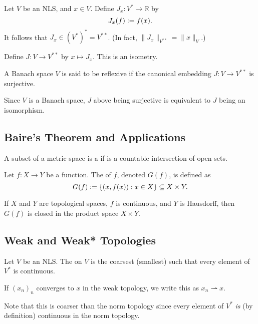 \documentclass[12pt]{article}	%
\newcommand{\weak}{\rightharpoonup}
\begin{document}
\begin{defn}
	Let $V$ be an NLS, and $x \in V$. Define $J_{x} : V^{\ast} \to \mathbb{R}$ by
	\begin{equation*} 
		J_{x}(f) \vcentcolon= f(x).
	\end{equation*}
	It follows that $J_{x} \in (V^{\ast})^{\ast} = V^{\ast \ast}$. (In fact, $\|J_{x}\|_{V^{\ast \ast}} = \|x\|_{V}$.)

	Define $J : V \to V^{\ast \ast}$ by $x \mapsto J_{x}$. This is an isometry.

	A Banach space $V$ is said to be reflexive if the canonical embedding $J : V \to V^{\ast \ast}$ is surjective.
\end{defn}
Since $V$ is a Banach space, $J$ above being surjective is equivalent to $J$ being an isomorphism.

\subsection{Baire's Theorem and Applications}

\begin{defn}
	A subset of a metric space is a  if is a countable intersection of open sets.
\end{defn}

\begin{defn}
	Let $f : X \to Y$ be a function. The  of $f$, denoted $G(f)$, is defined as
	\begin{equation*} 
		G(f) \vcentcolon= \{(x, f(x)) : x \in X\} \subset X \times Y.
	\end{equation*}
\end{defn}
If $X$ and $Y$ are topological spaces, $f$ is continuous, and $Y$ is Hausdorff, then $G(f)$ is closed in the product space $X \times Y$.

\subsection{Weak and Weak* Topologies}

\begin{defn}
	Let $V$ be an NLS. The  on $V$ is the coarsest (smallest) such that every element of $V^{\ast}$ is continuous.

	If $(x_{n})_{n}$ converges to $x$ in the weak topology, we write this as $x_{n} \weak x$.
\end{defn}
Note that this is coarser than the norm topology since every element of $V^{\ast}$ \emph{is} (by definition) continuous in the norm topology.
\end{document}
